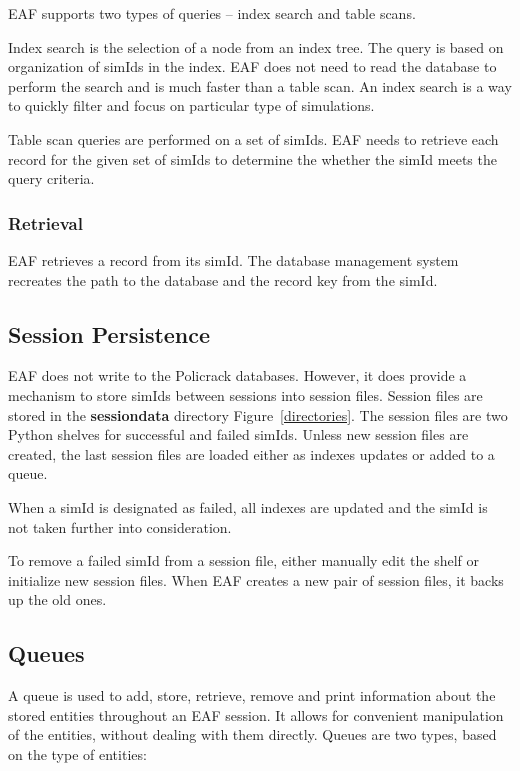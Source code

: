 \documentclass[10pt,a4paper]{article}
\begin{document}
EAF supports two types of queries -- index search and table scans.

Index search is the selection of a node from an index tree. The query is based on organization of simIds in the index. EAF does not need to read the database to perform the search and is much faster than a table scan. An index search is a way to quickly filter and focus on particular type of simulations.

Table scan queries are performed on a set of simIds. EAF needs to retrieve each record for the given set of simIds to determine the whether the simId meets the query criteria.


\subsubsection{Retrieval}

EAF retrieves a record from its simId. The database management system recreates the path to the database and the record key from the simId.


\subsection{Session Persistence}

EAF does not write to the Policrack databases. However, it does provide a mechanism to store simIds between sessions into session files. Session files are stored in the \textbf{sessiondata} directory Figure~\ref{directories}. The session files are two Python shelves for successful and failed simIds.
Unless new session files are created, the last session files are loaded either as indexes updates or added to a queue.

When a simId is designated as failed, all indexes are updated and the simId is not taken further into consideration.

To remove a failed simId from a session file, either manually edit the shelf or initialize new session files.
When EAF creates a new pair of session files, it backs up the old ones.


\subsection{Queues}

A queue is used to add, store, retrieve, remove and print information about the stored entities throughout an EAF session.
It allows for convenient manipulation of the entities, without dealing with them directly. Queues are two types, based on the type of entities:
\end{document}
